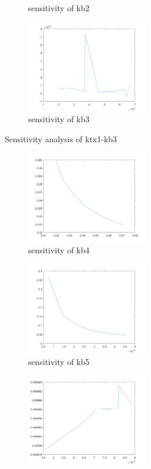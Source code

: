 \begin{figure}[H]
\begin{subfigure}{0.5\textwidth}
		\caption{sensitivity of kb2}
	\end{subfigure}%
	\begin{subfigure}{0.5\textwidth}
		\includegraphics[height=4cm]{b3.png}
		\caption{sensitivity of kb3}
	\end{subfigure}
	\caption{Sensitivity analysis of ktx1-kb3}
\end{figure}

\begin{figure}[H]
	\begin{subfigure}{0.5\textwidth}
		\includegraphics[height=4cm]{b4.png}
		\caption{sensitivity of kb4}
	\end{subfigure}%
	\begin{subfigure}{0.5\textwidth}
		\includegraphics[height=4cm]{b5.png}
		\caption{sensitivity of kb5}
	\end{subfigure}
	\begin{subfigure}{0.5\textwidth}
		\includegraphics[height=4cm]{b6.png}

\end{subfigure}
\end{figure}
